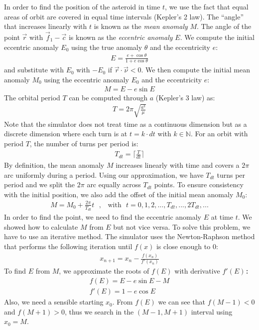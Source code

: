 \begin{appendices}
In order to find the position of the asteroid in time $t$, we use the fact that equal areas of orbit are covered in equal time intervals (Kepler's 2 law). The ``angle'' that increases linearly with $t$ is known as the \emph{mean anomaly} $M$. The angle of the point $\vec{r}$ with $\vec{f}_1-\vec{c}$ is known as the \emph{eccentric anomaly} $E$. We compute the initial eccentric anomaly $E_0$ using the true anomaly $\theta$ and the eccentricity $e$:
\begin{eqnarray*}
E = \frac{e + \cos{\theta}}{1 + e\cos{\theta}}
\end{eqnarray*}
and substitute with $E_0$ with $-E_0$ if $\vec{r} \cdot \vec{\nu} < 0$. We then compute the initial mean anomaly $M_0$ using the eccentric anomaly $E_0$ and the eccentricity $e$:
\begin{eqnarray*}
M = E - e\sin{E}
\end{eqnarray*}
The orbital period $T$ can be computed through $a$ (Kepler's 3 law) as:
\begin{eqnarray*}
T = 2\pi\sqrt{\frac{a^3}{\mu}}
\end{eqnarray*}
Note that the simulator does not treat time as a continuous dimension but as a discrete dimension where each turn is at $t = k \cdot dt$ with $k \in \mathbb{N}$. For an orbit with period $T$, the number of turns per period is:
\begin{eqnarray*}
T_{dt} = \lceil \frac{T}{dt} \rceil
\end{eqnarray*}
By definition, the mean anomaly $M$ increases linearly with time  and covers a $2\pi$ arc uniformly during a period. Using our approximation, we have $T_{dt}$ turns per period and we split the $2\pi$ arc equally across $T_{dt}$ points. To ensure consistency with the initial position, we also add the offset of the initial mean anomaly $M_0$:
\begin{eqnarray*}
M = M_0 + \frac{2\pi}{T_{dt}}t \text{~~,~~~with~~} t = 0,1,2,...,T_{dt},...,2T_{dt},...
\end{eqnarray*}
In order to find the point, we need to find the eccentric anomaly $E$ at time $t$. We showed how to calculate $M$ from $E$ but not vice versa. To solve this problem, we have to use an iterative method. The simulator uses the Newton-Raphson method that performs the following iteration until $f(x)$ is close enough to 0:
\begin{eqnarray*}
x_{n+1} = x_n - \frac{f(x_n)}{f'(x_n)}
\end{eqnarray*}
To find $E$ from $M$, we approximate the roots of $f(E)$ with derivative $f'(E)$\texttt{:}
\begin{eqnarray*}
f(E) = E - e \sin{E} - M\\
f'(E) = 1 - e \cos{E}
\end{eqnarray*}
Also, we need a sensible starting $x_0$. From $f(E)$ we can see that $f(M-1) < 0$ and $f(M+1) > 0$, thus we search in the $(M-1,M+1)$ interval using $x_0 = M$.


\end{appendices}
